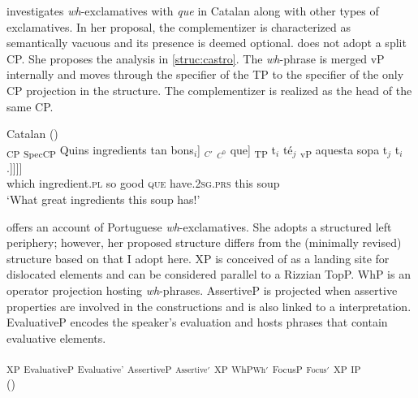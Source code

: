     

\citet{Castroviejo2006} investigates \textit{wh}-exclamatives with \emph{que} in Catalan along with other types of exclamatives.  In her proposal, the complementizer is characterized as semantically vacuous and its presence is deemed  optional.  \citet{Castroviejo2006} does not adopt a split CP. She  proposes the analysis in \eqref{struc:castro}. The \textit{wh}-phrase is merged vP internally and moves through the specifier of the TP to the specifier of the only CP projection in the structure. The complementizer is realized as the head of the same CP.

\ea\label{struc:castro}
Catalan (\citealt[50: ex 123b]{Castroviejo2006})\\
\gll {\ob}\textsubscript{CP} {\ob}\textsubscript{SpecCP} Quins ingredients tan bons$_i$] {\ob}$_{C'}$ {\ob}$_{C^0}$ que] {\ob}\textsubscript{TP} t$_i$ té$_j$ {\ob}\textsubscript{vP}  aquesta sopa t$_j$ t$_i$.]]]] \\
	{} {}	which ingredient.\textsc{pl} so good {} {}  \textsc{que} {} {}  have.\textsc{2sg.prs} {} this soup\\ 
	\glt `What great ingredients this soup has!' 
\z


\citet{Ambar2003} offers an account of Portuguese \textit{wh}-exclamatives. She adopts a structured left periphery;  however, her proposed structure differs from the (minimally revised) structure based on \citet{Rizzi1997} that I adopt here. 
XP is  conceived of as a landing site for dislocated elements and can be considered parallel to a Rizzian TopP. WhP is an operator projection hosting \textit{wh}-phrases. AssertiveP is projected when assertive properties are involved in the constructions and is also linked to a  interpretation. EvaluativeP encodes the speaker's evaluation and hosts phrases that contain evaluative elements.

\ea\label{struc:ambar} {\ob}\textsubscript{XP}  {\ob}\textsubscript{EvaluativeP}  {\ob}\textsubscript{Evaluative'} {\ob}\textsubscript{AssertiveP} {\ob}$_{\text{Assertive}'}$ {\ob}\textsubscript{XP}  {\ob}\textsubscript{WhP}{\ob}$_{\text{Wh}'}$ {\ob}\textsubscript{FocusP}  {\ob}$_{\text{Focus}'}$ {\ob}\textsubscript{XP} {\ob}\textsubscript{IP}  \\ (\citealt[211: ex 1]{Ambar2003})
\z

